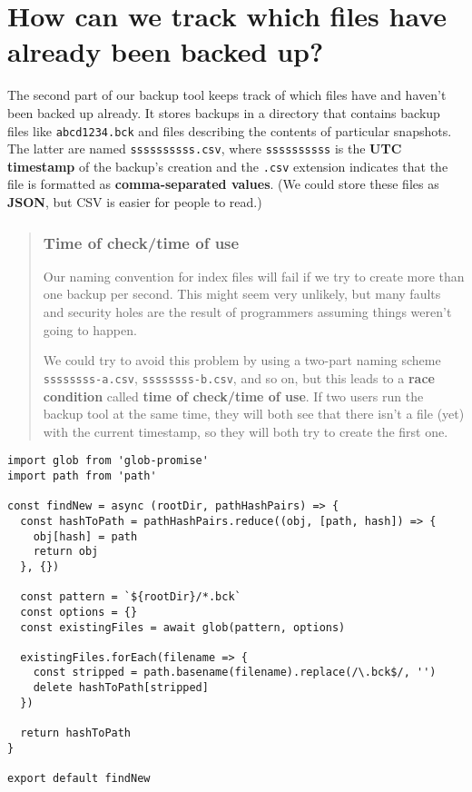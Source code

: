 \documentclass[krantzl]{krantz}
\newcommand{\glossref}[1]{\textbf{#1}}
\newenvironment{callout}{\savenotes\begin{tBox}\begin{quotation}\toggletrue{inbox}\renewcommand{\thempfootnote}{\arabic{footnote}}}{\end{quotation}\vspace{\baselineskip}\end{tBox}\togglefalse{inbox}\spewnotes}
\begin{document}
\section{How can we track which files have already been backed up?}\label{file-backup-track}


The second part of our backup tool keeps track of which files have and haven’t been backed up already.
It stores backups in a directory that contains backup files like \texttt{abcd1234.bck}
and files describing the contents of particular snapshots.
The latter are named \texttt{ssssssssss.csv},
where \texttt{ssssssssss} is the \glossref{UTC} \glossref{timestamp} of the backup’s creation
and the \texttt{.csv} extension indicates that the file is formatted as \glossref{comma-separated values}.
(We could store these files as \glossref{JSON}, but CSV is easier for people to read.)

\begin{callout}


\subsubsection*{Time of check/time of use}


Our naming convention for index files will fail if we try to create more than one backup per second.
This might seem very unlikely,
but many faults and security holes are the result of programmers assuming things weren’t going to happen.


We could try to avoid this problem by using a two-part naming scheme \texttt{ssssssss-a.csv},
\texttt{ssssssss-b.csv}, and so on,
but this leads to a \glossref{race condition}
called \glossref{time of check/time of use}.
If two users run the backup tool at the same time,
they will both see that there isn’t a file (yet) with the current timestamp,
so they will both try to create the first one.

\end{callout}


\begin{lstlisting}[frame=tblr]
import glob from 'glob-promise'
import path from 'path'

const findNew = async (rootDir, pathHashPairs) => {
  const hashToPath = pathHashPairs.reduce((obj, [path, hash]) => {
    obj[hash] = path
    return obj
  }, {})

  const pattern = `${rootDir}/*.bck`
  const options = {}
  const existingFiles = await glob(pattern, options)

  existingFiles.forEach(filename => {
    const stripped = path.basename(filename).replace(/\.bck$/, '')
    delete hashToPath[stripped]
  })

  return hashToPath
}

export default findNew
\end{lstlisting}
\end{document}
